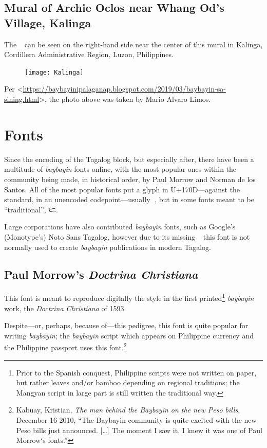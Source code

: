 \documentclass[a4paper,pagesize,openany,14pt,parskip=never]{scrbook}
\newcommand{\≈}{$\approx$}
\newcommand{\ra}{{\baybayin ᜍ}}
\begin{document}
\subsection{Mural of Archie Oclos near Whang Od's Village, Kalinga}

The \ra\ can be seen on the right-hand side near the center of this mural in Kalinga, Cordillera Administrative Region, Luzon, Philippines.

\begin{figure}[H]
\texttt{[image: Kalinga]}
\end{figure}

Per <\url{https://baybayinipalaganap.blogspot.com/2019/03/baybayin-sa-sining.html}>, the photo above was taken by Mario Alvaro Limos.

\section{Fonts}
\label{Fonts}

Since the encoding of the Tagalog block, but especially after, there have been a multitude of {\em baybayin} fonts online, with the most popular ones within the community being made, in historical order, by Paul Morrow and Norman de los Santos. All of the most popular fonts put a glyph in U+170D---against the standard, in an unencoded codepoint---usually \ra, but in some fonts meant to be ``traditional'', {\baybayin ᜇ}.

Large corporations have also contributed {\em baybayin} fonts, such as Google's (Monotype's) Noto Sans Tagalog, however due to its missing \ra\ this font is not normally used to create {\em baybayin} publications in modern Tagalog.

\subsection{Paul Morrow's {\em Doctrina Christiana}}

This font is meant to reproduce digitally the style in the first printed\footnote{Prior to the Spanish conquest, Philippine scripts were not written on paper, but rather leaves and/or bamboo depending on regional traditions; the Mangyan script in large part is still written the traditional way.} {\em baybayin} work, the {\em Doctrina Christiana} of 1593.

Despite---or, perhaps, because of---this pedigree, this font is quite popular for writing {\em baybayin}; the {\em baybayin} script which appears on Philippine currency and the Philippine passport uses this font.\footnote{Kabuay, Kristian, {\em The man behind the Baybayin on the new Peso bills}, December 16 2010, ``The Baybayin community is quite excited with the new Peso bills just announced. [\ldots] The moment I saw it, I knew it was one of Paul Morrow‘s fonts.''}
\end{document}
